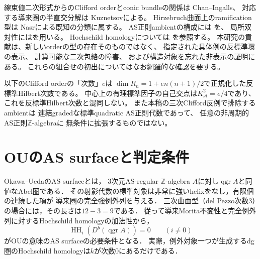 \documentclass[11pt,a4paper]{ltjsarticle}
\theoremstyle{definition}
\newcommand{\qgr}{\operatorname{qgr}}
\newcommand{\HH}{\operatorname{HH}}
\begin{document}
線束値二次形式からのClifford orderとconic bundleの関係は
Chan--Ingalls\cite{ChanIngalls2012}、
対応する導来圏の半直交分解は
Kuznetsov\cite{KuznetsovQuadric}による。
Hirzebruch曲面上のramification型は
Nasr\cite{Nasr2020}による既知の分類に属する。
AS正則ambientの構成には
\cite{CV2010,CKS2019,CKZ2017,LWW2014}を、
局所双対性には\cite{YZ1997}を用いる。
Hochschild homologyについては
\cite{Baranovsky,CGW,Ruan,ACH}を参照する。
本研究の貢献は、新しいorderの型の存在そのものではなく、
指定された具体例の反標準環の表示、
計算可能な二次包絡の障害、
および構造対象を忘れた非表示の証明にある。
これらの組合せの初出についてはなお網羅的な確認を要する。

以下のClifford orderの「次数」$e$は
$\dim R_n=1+en(n+1)/2$で正規化した反標準Hilbert次数である。
中心上の有理標準因子の自己交点は$K_{\mathcal A}^2=e/4$であり、
これを反標準Hilbert次数と混同しない。
また本稿の三次Clifford反例で排除するambientは
連結gradedな標準quadratic AS正則代数であって、
任意の非周期的AS正則$\mathbb Z$-algebraに
無条件に拡張するものではない。

\section{OUのAS surfaceと判定条件}
Okawa--Ueda\cite[Definition~1.1(1), \S3]{OU}のAS surfaceとは，
3次元AS-regular $\mathbb Z$-algebra $A$に対し$\qgr A$と同値なAbel圏である．
その射影代数の標準対象は非常に強いhelixをなし，有限個の連続した項が
導来圏の完全強例外列を与える\cite[(3.9)--(3.10)]{OU}．
三次曲面型（del Pezzo次数3）の場合には，その長さは$12-3=9$である．
従って導来Morita不変性と完全例外列に対するHochschild homologyの加法性から，
\begin{equation}\label{eq:ou-odd-zero}
 \HH_i(D^b(\qgr A))=0\qquad(i\ne0)
\end{equation}
がOUの意味のAS surfaceの必要条件となる．
実際，例外対象一つが生成するdg圏のHochschild homologyは$k$が次数0にあるだけである．
\end{document}
